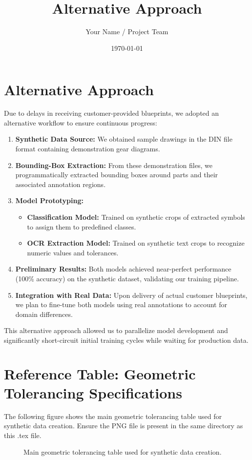 \documentclass[a4paper,12pt]{article}
\title{Alternative Approach}
\author{Your Name / Project Team}
\date{\today}
\begin{document}
\maketitle

\section*{Alternative Approach}
Due to delays in receiving customer-provided blueprints, we adopted an alternative workflow to ensure continuous progress:

\begin{enumerate}
  \item \textbf{Synthetic Data Source:} We obtained sample drawings in the DIN file format containing demonstration gear diagrams.
  \item \textbf{Bounding-Box Extraction:} From these demonstration files, we programmatically extracted bounding boxes around parts and their associated annotation regions.
  \item \textbf{Model Prototyping:}
    \begin{itemize}
      \item \textbf{Classification Model:} Trained on synthetic crops of extracted symbols to assign them to predefined classes.
      \item \textbf{OCR Extraction Model:} Trained on synthetic text crops to recognize numeric values and tolerances.
    \end{itemize}
  \item \textbf{Preliminary Results:} Both models achieved near-perfect performance (100\% accuracy) on the synthetic dataset, validating our training pipeline.
  \item \textbf{Integration with Real Data:} Upon delivery of actual customer blueprints, we plan to fine-tune both models using real annotations to account for domain differences.
\end{enumerate}

This alternative approach allowed us to parallelize model development and significantly short-circuit initial training cycles while waiting for production data.

\section*{Reference Table: Geometric Tolerancing Specifications}
The following figure shows the main geometric tolerancing table used for synthetic data creation. Ensure the PNG file is present in the same directory as this .tex file.

\begin{figure}[h!]
  \centering
  \caption{Main geometric tolerancing table used for synthetic data creation.}
  \label{fig:geom_tol}
\end{figure}
\end{document}
